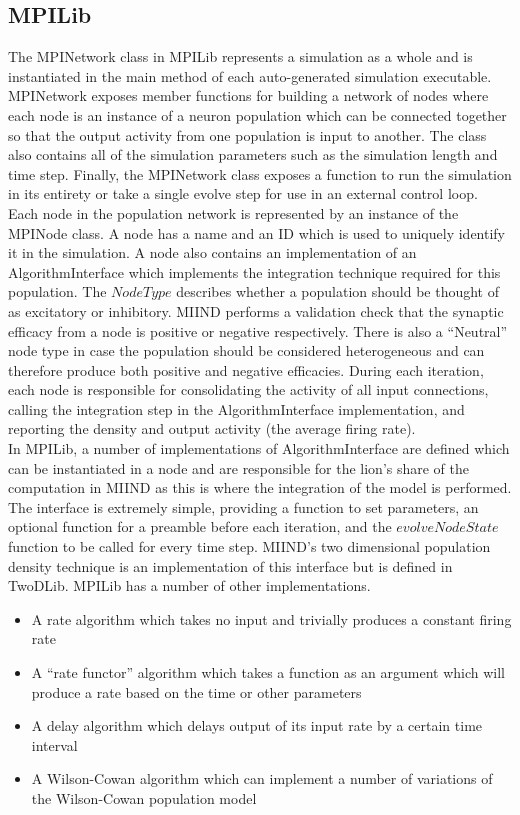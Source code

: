 \documentclass[utf8]{frontiers_suppmat} %
\begin{document}
\subsection{MPILib}

The MPINetwork class in MPILib represents a simulation as a whole and is instantiated in the main method of each auto-generated simulation executable. MPINetwork exposes member functions for building a network of nodes where each node is an instance of a neuron population which can be connected together so that the output activity from one population is input to another. The class also contains all of the simulation parameters such as the simulation length and time step. Finally, the MPINetwork class exposes a function to run the simulation in its entirety or take a single evolve step for use in an external control loop.\\

Each node in the population network is represented by an instance of the MPINode class. A node has a name and an ID which is used to uniquely identify it in the simulation. A node also contains an implementation of an AlgorithmInterface which implements the integration technique required for this population. The $NodeType$ describes whether a population should be thought of as excitatory or inhibitory. MIIND performs a validation check that the synaptic efficacy from a node is positive or negative respectively. There is also a ``Neutral'' node type in case the population should be considered heterogeneous and can therefore produce both positive and negative efficacies. During each iteration, each node is responsible for consolidating the activity of all input connections, calling the integration step in the AlgorithmInterface implementation, and reporting the density and output activity (the average firing rate).\\
In MPILib, a number of implementations of AlgorithmInterface are defined which can be instantiated in a node and are responsible for the lion's share of the computation in MIIND as this is where the integration of the model is performed. The interface is extremely simple, providing a function to set parameters, an optional function for a preamble before each iteration, and the $evolveNodeState$ function to be called for every time step. MIIND's two dimensional population density technique is an implementation of this interface but is defined in TwoDLib. MPILib has a number of other implementations.

\begin{itemize}
\item A rate algorithm which takes no input and trivially produces a constant firing rate
\item A ``rate functor'' algorithm which takes a function as an argument which will produce a rate based on the time or other parameters
\item A delay algorithm which delays output of its input rate by a certain time interval
\item A Wilson-Cowan algorithm which can implement a number of variations of the Wilson-Cowan population model \citep{wilson1972excitatory}
\end{itemize}
\end{document}
